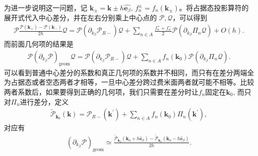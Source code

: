 \documentclass[10pt, oneside]{article}
\begin{document}
为进一步说明这一问题，记 \( \bm{k}_{\pm} = \bm{k} \pm h \hat{\bm{e }_{\beta}}, \, f_n^\pm=f_n \left(\bm{k}_{\pm}\right)\)。将占据态投影算符的展开式代入中心差分，并在左右分别乘上中心点的 \(\mathcal P,\mathcal Q\)，可以得到
\begin{align}
	\mathcal{P} \frac{\mathcal{P} \left(\bm{k}_{+} \right) - \mathcal{P} \left( \bm{k}_{-}\right)}{2 h } \mathcal{Q} = \mathcal{P} \left(\partial_{k_{\beta}} \mathcal{P}_{R-}\right) \mathcal{Q} + \sum_{n \in A } \frac{f^{+}_{n } + f^{-}_{n }}{2} \mathcal{P} \left(\partial_{k_{\beta}} \Pi_{n } \mathcal{Q}\right) + O \left(h \right).
\end{align}
而前面几何项的结果是
\begin{align}
	\mathcal{P} \left(\partial_{k_{\beta}} \mathcal{P}\right)_{\mathrm{geom } } \mathcal{Q} = \mathcal{P} \left(\partial_{k_{\beta}} \mathcal{P}_{R-}\right) \mathcal{Q} + \sum_{n \in A } f_n \left(\bm{k}_{0}\right) \mathcal{P} \left(\partial_{k_{\beta}} \Pi_{n } \mathcal{Q}\right).
\end{align}
可以看到普通中心差分的系数和真正几何项的系数并不相同，而只有在差分两端全为占据态或者空态两者才相等，一旦中心差分跨过费米面两者就可能不相等。比较两者系数后，如果要得到正确的几何项，我们只需要在差分时让\(f_{n}\)固定在\(\bm{k}_{0 }\), 而只对\(\Pi_{n }\)进行差分，定义
\begin{align}
	\boxed{
		\widetilde{\mathcal{P}}_{\bm{k}_{0}} \left(\bm{k}\right) = \mathcal{P}_{R-} \left(\bm{k}^{\prime}\right) + \sum_{n \in A } f_{n} \left(\bm{k}_{0}\right) \Pi_{n } \left(\bm{k}^{\prime}\right),	
	}	
\end{align}
对应有
\begin{align}
	\boxed{
		\left(\partial_{k_{\beta}} \mathcal{P}\right)_{\mathrm{geom }} \simeq \frac{\widetilde{\mathcal{P}}_{\bm{k}_{0}} \left(\bm{k}_0 + h \hat{\bm{e }}_{\beta}\right) - \widetilde{\mathcal{P}}_{\bm{k}_{0}} \left(\bm{k}_0 - h \hat{\bm{e }}_{\beta}\right) }{2 h}.
	}
\end{align}
\end{document}

